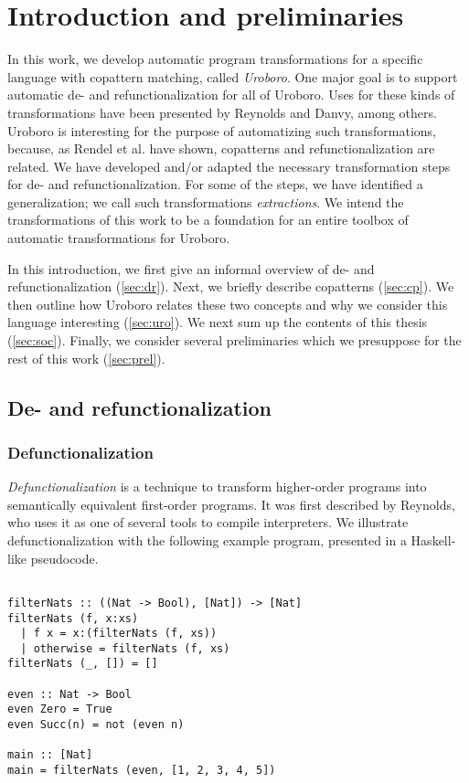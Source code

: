 \chapter{Introduction and preliminaries}

In this work, we develop automatic program transformations for a specific language with copattern matching, called \textit{Uroboro}. One major goal is to support automatic de- and refunctionalization for all of Uroboro. Uses for these kinds of transformations have been presented by Reynolds and Danvy, among others. Uroboro is interesting for the purpose of automatizing such transformations, because, as Rendel et al. have shown, copatterns and refunctionalization are related. We have developed and/or adapted the necessary transformation steps for de- and refunctionalization. For some of the steps, we have identified a generalization; we call such transformations \textit{extractions}. We intend the transformations of this work to be a foundation for an entire toolbox of automatic transformations for Uroboro.

In this introduction, we first give an informal overview of de- and refunctionalization (\autoref{sec:dr}). Next, we briefly describe copatterns (\autoref{sec:cp}). We then outline how Uroboro relates these two concepts and why we consider this language interesting (\autoref{sec:uro}). We next sum up the contents of this thesis (\autoref{sec:soc}). Finally, we consider several preliminaries which we presuppose for the rest of this work (\autoref{sec:prel}).

\section{De- and refunctionalization}
\label{sec:dr}

\subsection{Defunctionalization}
\label{ssec:defunc}

\textit{Defunctionalization} is a technique to transform higher-order programs into semantically equivalent first-order programs. It was first described by Reynolds, who uses it as one of several tools to compile interpreters. We illustrate defunctionalization with the following example program, presented in a Haskell-like pseudocode.

\begin{lstlisting}

filterNats :: ((Nat -> Bool), [Nat]) -> [Nat]
filterNats (f, x:xs)
  | f x = x:(filterNats (f, xs))
  | otherwise = filterNats (f, xs)
filterNats (_, []) = []

even :: Nat -> Bool
even Zero = True
even Succ(n) = not (even n)

main :: [Nat]
main = filterNats (even, [1, 2, 3, 4, 5])

\end{lstlisting}


